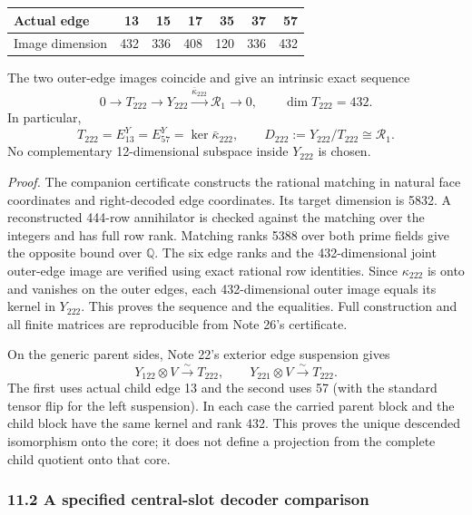 \documentclass[
  11pt,
  a4paper,
]{article}
\begin{document}
\begin{longtable}[]{@{}lrrrrrr@{}}
\toprule\noalign{}
Actual edge & 13 & 15 & 17 & 35 & 37 & 57 \\
\midrule\noalign{}
\endhead
\bottomrule\noalign{}
\endlastfoot
Image dimension & 432 & 336 & 408 & 120 & 336 & 432 \\
\end{longtable}

The two outer-edge images coincide and give an intrinsic exact sequence
\[
 0\longrightarrow T_{222}\longrightarrow Y_{222}
 \xrightarrow{\bar\kappa_{222}}\mathcal R_1\longrightarrow0,
 \qquad \dim T_{222}=432.
\] In particular, \[
 T_{222}=E^Y_{13}=E^Y_{57}=\ker\bar\kappa_{222},\qquad
 D_{222}:=Y_{222}/T_{222}\cong\mathcal R_1.
\] No complementary 12-dimensional subspace inside \(Y_{222}\) is
chosen.

\emph{Proof.} The companion certificate constructs the rational matching
in natural face coordinates and right-decoded edge coordinates. Its
target dimension is 5832. A reconstructed 444-row annihilator is checked
against the matching over the integers and has full row rank. Matching
ranks 5388 over both prime fields give the opposite bound over
\(\mathbb Q\). The six edge ranks and the 432-dimensional joint
outer-edge image are verified using exact rational row identities. Since
\(\kappa_{222}\) is onto and vanishes on the outer edges, each
432-dimensional outer image equals its kernel in \(Y_{222}\). This
proves the sequence and the equalities. Full construction and all finite
matrices are reproducible from Note 26's certificate.

On the generic parent sides, Note 22's exterior edge suspension gives \[
 Y_{122}\otimes V\xrightarrow{\sim}T_{222},\qquad
 Y_{221}\otimes V\xrightarrow{\sim}T_{222}.
\] The first uses actual child edge 13 and the second uses 57 (with the
standard tensor flip for the left suspension). In each case the carried
parent block and the child block have the same kernel and rank 432. This
proves the unique descended isomorphism onto the core; it does not
define a projection from the complete child quotient onto that core.

\hypertarget{a-specified-central-slot-decoder-comparison}{%
\subsubsection{11.2 A specified central-slot decoder
comparison}\label{a-specified-central-slot-decoder-comparison}}
\end{document}
